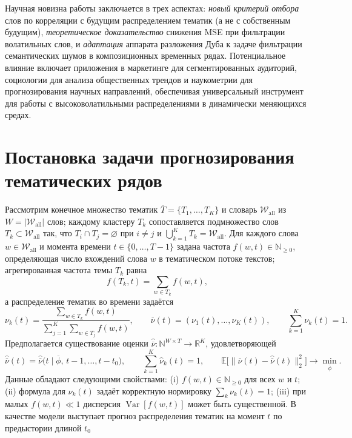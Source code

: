 \documentclass[14pt,a4paper]{article}
\begin{document}
Научная новизна работы заключается в трех аспектах: \textit{новый критерий отбора} слов по корреляции с будущим распределением тематик (а не с собственным будущим), \textit{теоретическое доказательство} снижения MSE при фильтрации волатильных слов, и \textit{адаптация} аппарата разложения Дуба к задаче фильтрации семантических шумов в композиционных временных рядах. Потенциальное влияние включает приложения в маркетинге для сегментированных аудиторий, социологии для анализа общественных трендов и наукометрии для прогнозирования научных направлений, обеспечивая универсальный инструмент для работы с высоковолатильными распределениями в динамически меняющихся средах.





\newpage
\section{Постановка задачи прогнозирования тематических рядов}
Рассмотрим конечное множество тематик $\overline{T}=\{T_1,\dots,T_K\}$ и словарь $\mathcal{W}_{\mathrm{all}}$ из $W=|\mathcal{W}_{\mathrm{all}}|$ слов; каждому кластеру $T_k$ сопоставляется подмножество слов $T_k\subset\mathcal{W}_{\mathrm{all}}$ так, что $T_i\cap T_j=\varnothing$ при $i\neq j$ и $\bigcup_{k=1}^K T_k=\mathcal{W}_{\mathrm{all}}$. Для каждого слова $w\in\mathcal{W}_{\mathrm{all}}$ и момента времени $t\in\{0,\dots,T-1\}$ задана частота $f(w,t)\in\mathbb{N}_{\ge0}$, определяющая число вхождений слова $w$ в тематическом потоке текстов; агрегированная частота темы $T_k$ равна
\[
f(T_k,t)=\sum_{w\in T_k}f(w,t),
\]
а распределение тематик во времени задаётся
\[
\nu_k(t)=\frac{\sum_{w\in T_k}f(w,t)}{\sum_{j=1}^K\sum_{w\in T_j}f(w,t)},\qquad\overline{\nu}(t)=(\nu_1(t),\dots,\nu_K(t)),\qquad\sum_{k=1}^K\nu_k(t)=1.
\]
Предполагается существование оценки $\widehat{\overline{\nu}}\colon\mathbb{N}^{W\times T}\to\mathbb{R}^K$, удовлетворяющей
\[
\widehat{\overline{\nu}}(t)=\widehat{\overline{\nu}}\bigl(t\mid\overline{\phi},\,t-1,\dots,t-t_0\bigr),\qquad\sum_{k=1}^K\widehat{\nu}_k(t)=1,\qquad\mathbb{E}\bigl[\|\overline{\nu}(t)-\widehat{\overline{\nu}}(t)\|_2^2\bigr]\to\min_{\overline{\phi}}.
\]
Данные обладают следующими свойствами: (i) $f(w,t)\in\mathbb{N}_{\ge0}$ для всех $w$ и $t$; (ii) формула для $\nu_k(t)$ задаёт корректную нормировку $\sum_{k}\nu_k(t)=1$; (iii) при малых $f(w,t)\ll1$ дисперсия $\operatorname{Var}[f(w,t)]$ может быть существенной. В качестве модели выступает прогноз распределения тематик на момент $t$ по предыстории длиной $t_0$
\end{document}
